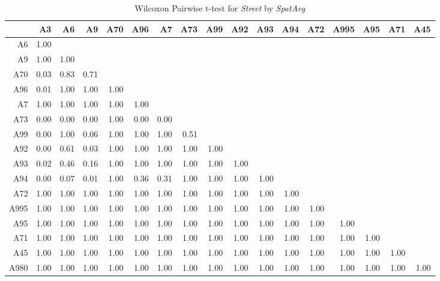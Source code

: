 \begin{table}[ht]
	\tiny
	\setlength{\tabcolsep}{4pt}
	\centering
	\begin{tabular}{rrrrrrrrrrrrrrrrr}
		\toprule
	 	& A3 & A6 & A9 & A70 & A96 & A7 & A73 & A99 & A92 & A93 & A94 & A72 & A995 & A95 & A71 & A45 \\ 
		\midrule
		A6 & 1.00 &  &  &  &  &  &  &  &  &  &  &  &  &  &  &  \\ 
	  	A9 & 1.00 & 1.00 &  &  &  &  &  &  &  &  &  &  &  &  &  &  \\ 
	  	A70 & 0.03 & 0.83 & 0.71 &  &  &  &  &  &  &  &  &  &  &  &  &  \\ 
	  	A96 & 0.01 & 1.00 & 1.00 & 1.00 &  &  &  &  &  &  &  &  &  &  &  &  \\ 
	  	A7 & 1.00 & 1.00 & 1.00 & 1.00 & 1.00 &  &  &  &  &  &  &  &  &  &  &  \\ 
	  	A73 & 0.00 & 0.00 & 0.00 & 1.00 & 0.00 & 0.00 &  &  &  &  &  &  &  &  &  &  \\ 
	  	A99 & 0.00 & 1.00 & 0.06 & 1.00 & 1.00 & 1.00 & 0.51 &  &  &  &  &  &  &  &  &  \\ 
	  	A92 & 0.00 & 0.61 & 0.03 & 1.00 & 1.00 & 1.00 & 1.00 & 1.00 &  &  &  &  &  &  &  &  \\ 
	  	A93 & 0.02 & 0.46 & 0.16 & 1.00 & 1.00 & 1.00 & 1.00 & 1.00 & 1.00 &  &  &  &  &  &  &  \\ 
	  	A94 & 0.00 & 0.07 & 0.01 & 1.00 & 0.36 & 0.31 & 1.00 & 1.00 & 1.00 & 1.00 &  &  &  &  &  &  \\ 
	  	A72 & 1.00 & 1.00 & 1.00 & 1.00 & 1.00 & 1.00 & 1.00 & 1.00 & 1.00 & 1.00 & 1.00 &  &  &  &  &  \\ 
	  	A995 & 1.00 & 1.00 & 1.00 & 1.00 & 1.00 & 1.00 & 1.00 & 1.00 & 1.00 & 1.00 & 1.00 & 1.00 &  &  &  &  \\ 
	  	A95 & 1.00 & 1.00 & 1.00 & 1.00 & 1.00 & 1.00 & 1.00 & 1.00 & 1.00 & 1.00 & 1.00 & 1.00 & 1.00 &  &  &  \\ 
	  	A71 & 1.00 & 1.00 & 1.00 & 1.00 & 1.00 & 1.00 & 1.00 & 1.00 & 1.00 & 1.00 & 1.00 & 1.00 & 1.00 & 1.00 &  &  \\ 
	  	A45 & 1.00 & 1.00 & 1.00 & 1.00 & 1.00 & 1.00 & 1.00 & 1.00 & 1.00 & 1.00 & 1.00 & 1.00 & 1.00 & 1.00 & 1.00 &  \\ 
	  	A980 & 1.00 & 1.00 & 1.00 & 1.00 & 1.00 & 1.00 & 1.00 & 1.00 & 1.00 & 1.00 & 1.00 & 1.00 & 1.00 & 1.00 & 1.00 & 1.00 \\ 
		\bottomrule
	\end{tabular}
	\caption{Wilcoxon Pairwise t-test for \textit{Street} by \textit{SpatAvg}}
\end{table}


